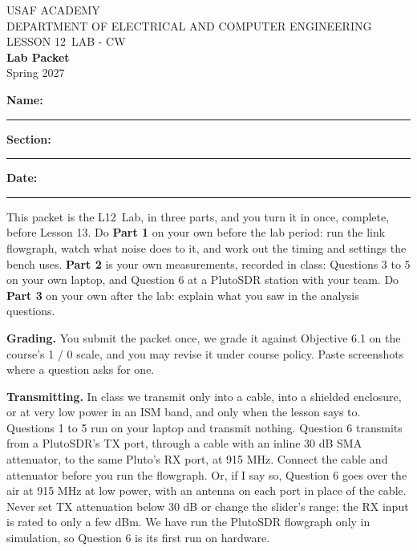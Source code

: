 \documentclass{exam}
\def\labLesson{12}
\def\thisterm{\thisTermIn}
\def\thisterm{Spring 2027}
\begin{document}
\pagestyle{headandfoot}   %


\begin{center}
USAF ACADEMY \\
DEPARTMENT OF ELECTRICAL AND COMPUTER ENGINEERING \\
LESSON \labLesson\ LAB - CW \\
\textbf{Lab Packet} \\
\thisterm \\[4mm]
\end{center}

\vspace{-4pt}
\textbf{Name:} \rule[-2pt]{2.6in}{0.4pt} \hfill
\textbf{Section:} \rule[-2pt]{0.9in}{0.4pt} \hfill
\textbf{Date:} \rule[-2pt]{1.1in}{0.4pt}

\vspace{4pt}


\vspace{2pt}

This packet is the L\labLesson\ Lab, in three parts, and you turn it in once, complete,
before Lesson 13. Do \textbf{Part 1} on your own before the lab period: run the link
flowgraph, watch what noise does to it, and work out the timing and settings the bench
uses. \textbf{Part 2} is
your own measurements, recorded in class: Questions 3 to 5 on your own laptop, and
Question 6 at a PlutoSDR station with your team. Do \textbf{Part 3} on your own after
the lab: explain what you saw in the analysis questions.

\textbf{Grading.} You submit the packet once, we grade it against Objective 6.1 on
the course's 1 / 0 scale, and you may revise it under course policy. Paste screenshots where a
question asks for one.

\textbf{Transmitting.} In class we transmit only into a cable, into a shielded
enclosure, or at very low power in an ISM band, and only when the lesson says to.
Questions 1 to 5 run on your laptop and transmit nothing. Question 6 transmits from a
PlutoSDR's TX port, through a cable with an inline 30 dB SMA attenuator, to the same
Pluto's RX port, at 915 MHz. Connect the cable and attenuator before you run the
flowgraph. Or, if I say so, Question 6 goes over the air at 915 MHz at
low power, with an antenna on each port in place of the cable. Never set TX attenuation below
30 dB or change the slider's range; the RX input is rated to only a few dBm. We have
run the PlutoSDR flowgraph only in simulation, so Question 6 is its first run on
hardware.
\end{document}
